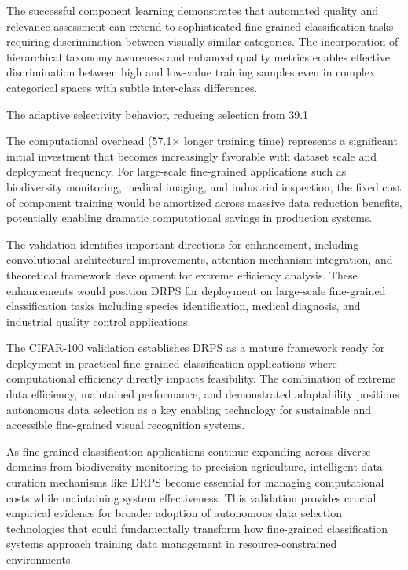 \documentclass[12pt]{article}
\begin{document}
The successful component learning demonstrates that automated quality and relevance assessment can extend to sophisticated fine-grained classification tasks requiring discrimination between visually similar categories. The incorporation of hierarchical taxonomy awareness and enhanced quality metrics enables effective discrimination between high and low-value training samples even in complex categorical spaces with subtle inter-class differences.

The adaptive selectivity behavior, reducing selection from 39.1%

The computational overhead (57.1× longer training time) represents a significant initial investment that becomes increasingly favorable with dataset scale and deployment frequency. For large-scale fine-grained applications such as biodiversity monitoring, medical imaging, and industrial inspection, the fixed cost of component training would be amortized across massive data reduction benefits, potentially enabling dramatic computational savings in production systems.

The validation identifies important directions for enhancement, including convolutional architectural improvements, attention mechanism integration, and theoretical framework development for extreme efficiency analysis. These enhancements would position DRPS for deployment on large-scale fine-grained classification tasks including species identification, medical diagnosis, and industrial quality control applications.

The CIFAR-100 validation establishes DRPS as a mature framework ready for deployment in practical fine-grained classification applications where computational efficiency directly impacts feasibility. The combination of extreme data efficiency, maintained performance, and demonstrated adaptability positions autonomous data selection as a key enabling technology for sustainable and accessible fine-grained visual recognition systems.

As fine-grained classification applications continue expanding across diverse domains from biodiversity monitoring to precision agriculture, intelligent data curation mechanisms like DRPS become essential for managing computational costs while maintaining system effectiveness. This validation provides crucial empirical evidence for broader adoption of autonomous data selection technologies that could fundamentally transform how fine-grained classification systems approach training data management in resource-constrained environments.
\end{document}
